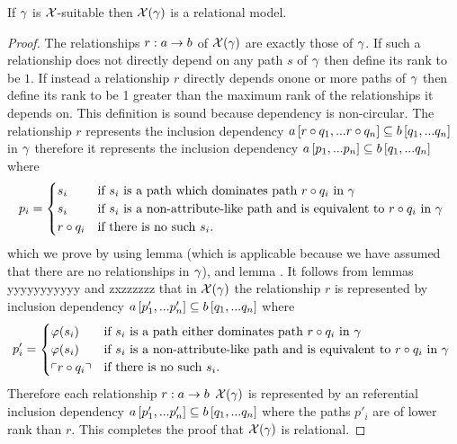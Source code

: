 \begin{lemma}
If $\gamma$ is $\mathcal{X}$-suitable then $\mathcal{X}(\gamma)$ is a relational model.
\end{lemma}
\begin{proof}
The relationships $r: a \rightarrow b$ of $\mathcal{X}(\gamma)$ are exactly those of $\gamma$. If such a relationship does not directly depend on any path $s$ of $\gamma$ then define its rank to be $1$.
If instead a relationship $r$ directly depends onone or more paths of $\gamma$ then define its rank to be 1 greater than the maximum rank of the relationships it depends on. 
This definition is sound because dependency is non-circular.
The relationship $r$ represents the inclusion dependency $a\left[r \circ q_1,...r \circ q_n\right]\subseteq b\left[q_1,...q_n\right]$ in $\gamma$ therefore it represents
the inclusion dependency $a\left[p_1,...p_n\right]\subseteq b\left[q_1,...q_n\right]$ where 
$$
p_i =
\begin{cases} 
    s_i         & \mbox{if $s_i$ is a path which dominates path $r \circ q_i$ in $\gamma$} \\
    s_i         & \mbox{if $s_i$ is a non-attribute-like path and is equivalent to  $r \circ q_i$ in $\gamma$ }  \\
    r \circ q_i & \mbox{if there is no such $s_i$.}
\end{cases} 
$$
which we prove by using lemma  (which is applicable because we have assumed 
that there are no   relationships in $\gamma$), and lemma .
It follows from lemmas yyyyyyyyyyy  and zxzzzzzz that in $\mathcal{X}(\gamma)$ the relationship $r$ is represented by inclusion dependency $a\left[p'_1,...p'_n\right]\subseteq b\left[q_1,...q_n\right]$ where
$$
p'_i =
\begin{cases}
   \varphi(s_i)     & \mbox{if $s_i$ is a path  either dominates path $r \circ q_i$ in $\gamma$} \\
   \varphi(s_i)     & \mbox{if $s_i$ is a non-attribute-like path and is equivalent to  $r \circ q_i$ in $\gamma$ }  \\
   \left\ulcorner r \circ q_i\right\urcorner  & \mbox{if there is no such $s_i$.}
\end{cases} 
$$
Therefore each relationship $r: a \rightarrow b$ $\mathcal{X}(\gamma)$ is represented by an referential inclusion dependency $a\left[p'_1,...p'_n\right]\subseteq b\left[q_1,...q_n\right]$
where the paths $p'_i$ are of lower rank than $r$. This completes the proof that $\mathcal{X}(\gamma)$ is relational.
\end{proof}



